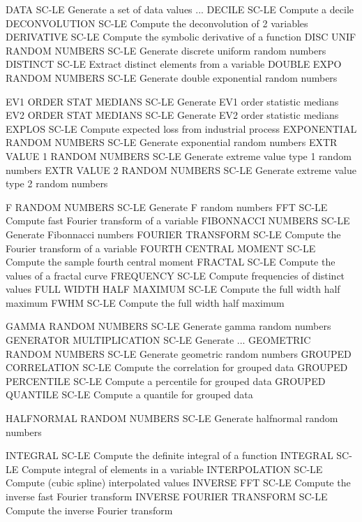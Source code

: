 DATA                        SC-LE Generate a set of data values
... DECILE                  SC-LE Compute a decile
DECONVOLUTION               SC-LE Compute the deconvolution of 2 variables
DERIVATIVE                  SC-LE Compute the symbolic derivative of a function
DISC UNIF RANDOM NUMBERS    SC-LE Generate discrete uniform random numbers
DISTINCT                    SC-LE Extract distinct elements from a variable
DOUBLE EXPO RANDOM NUMBERS  SC-LE Generate double exponential random numbers

EV1 ORDER STAT MEDIANS      SC-LE Generate EV1 order statistic medians
EV2 ORDER STAT MEDIANS      SC-LE Generate EV2 order statistic medians
EXPLOS                      SC-LE Compute expected loss from industrial process
EXPONENTIAL RANDOM NUMBERS  SC-LE Generate exponential random numbers
EXTR VALUE 1 RANDOM NUMBERS SC-LE Generate extreme value type 1 random numbers
EXTR VALUE 2 RANDOM NUMBERS SC-LE Generate extreme value type 2 random numbers

F RANDOM NUMBERS            SC-LE Generate F random numbers
FFT                         SC-LE Compute fast Fourier transform of a variable
FIBONNACCI NUMBERS          SC-LE Generate Fibonnacci numbers
FOURIER TRANSFORM           SC-LE Compute the Fourier transform of a variable
FOURTH CENTRAL MOMENT       SC-LE Compute the sample fourth central moment
FRACTAL                     SC-LE Compute the values of a fractal curve
FREQUENCY                   SC-LE Compute frequencies of distinct values
FULL WIDTH HALF MAXIMUM     SC-LE Compute the full width half maximum
FWHM                        SC-LE Compute the full width half maximum

GAMMA RANDOM NUMBERS        SC-LE Generate gamma random numbers
GENERATOR MULTIPLICATION    SC-LE Generate ...
GEOMETRIC RANDOM NUMBERS    SC-LE Generate geometric random numbers
GROUPED CORRELATION         SC-LE Compute the correlation for grouped data
GROUPED PERCENTILE          SC-LE Compute a percentile for grouped data
GROUPED QUANTILE            SC-LE Compute a quantile for grouped data

HALFNORMAL RANDOM NUMBERS   SC-LE Generate halfnormal random numbers

INTEGRAL                    SC-LE Compute the definite integral of a function
INTEGRAL                    SC-LE Compute integral of elements in a variable
INTERPOLATION               SC-LE Compute (cubic spline) interpolated values
INVERSE FFT                 SC-LE Compute the inverse fast Fourier transform
INVERSE FOURIER TRANSFORM   SC-LE Compute the inverse Fourier transform

